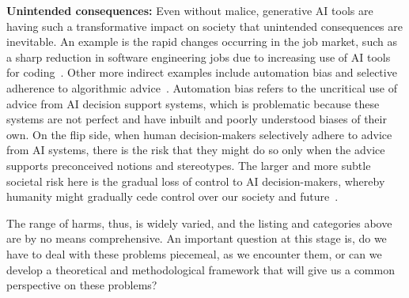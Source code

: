\smallskip
\noindent
\textbf{Unintended consequences:} Even without malice, generative AI tools are having such a transformative impact on society that unintended 
consequences are inevitable. An example is the rapid changes occurring in the job market, such as a sharp reduction in software engineering jobs 
due to increasing use of AI tools for coding~\citep{kessler24coding}. Other more indirect examples include automation bias and selective 
adherence to algorithmic advice~\citep{AlonBarkat2022}. Automation bias refers to the uncritical use of advice from AI decision support
systems, which is problematic because these systems are not perfect and have inbuilt and poorly understood biases of their own. On the flip
side, when human decision-makers selectively adhere to advice from AI systems, there is the risk that they might do so only when the advice 
supports preconceived notions and stereotypes. The larger and more subtle societal risk here is the gradual loss of control to AI 
decision-makers, whereby humanity might gradually cede control over our society and future~\citep{Bernardi2024}. 

The range of harms, thus, is widely varied, and the listing and categories above are by no means comprehensive. An important question at this 
stage is, do we have to deal with these problems piecemeal, as we encounter them, or can we develop a theoretical and methodological framework 
that will give us a common perspective on these problems?

